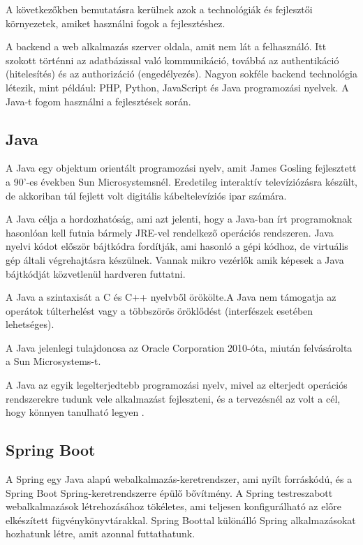 
A következőkben bemutatásra kerülnek azok a technológiák és fejlesztői környezetek, amiket használni fogok a fejlesztéshez.


A backend a web alkalmazás szerver oldala, amit nem lát a felhasználó. Itt szokott történni az adatbázissal való kommunikáció, továbbá az authentikáció (hitelesítés) és az authorizáció (engedélyezés). Nagyon sokféle backend technológia létezik, mint például: PHP, Python, JavaScript és Java programozási nyelvek. A Java-t fogom használni a fejlesztések során.

\subsection{Java}

A Java \cite{Java} egy objektum orientált programozási nyelv, amit James Gosling fejlesztett a 90’-es években Sun Microsystemsnél. Eredetileg interaktív televíziózásra készült, de akkoriban túl fejlett volt digitális kábeltelevíziós ipar számára.

A Java célja a hordozhatóság, ami azt jelenti, hogy a Java-ban írt programoknak hasonlóan kell futnia bármely JRE-vel rendelkező operációs rendszeren. Java nyelvi kódot először bájtkódra fordítják, ami hasonló a gépi kódhoz, de virtuális gép általi végrehajtásra készülnek. Vannak mikro vezérlők amik képesek a Java bájtkódját közvetlenül hardveren futtatni.

A Java a szintaxisát a C és C++ nyelvből örökölte.A Java nem támogatja az operátok túlterhelést vagy a többszörös öröklődést (interfészek esetében lehetséges).

A Java jelenlegi tulajdonosa az Oracle Corporation 2010-óta, miután felvásárolta a Sun Microsystems-t.

A Java az egyik legelterjedtebb programozási nyelv, mivel az elterjedt operációs rendszerekre tudunk vele alkalmazást fejleszteni, és a tervezésnél az volt a cél, hogy könnyen tanulható legyen .

\subsection{Spring Boot}

A Spring egy Java alapú webalkalmazás-keretrendszer, ami nyílt forráskódú, és a Spring Boot Spring-keretrendszerre épülő bővítmény. A Spring testreszabott webalkalmazások létrehozásához tökéletes, ami teljesen konfigurálható az előre elkészített fügvénykönyvtárakkal. Spring Boottal különálló Spring alkalmazásokat hozhatunk létre, amit azonnal futtathatunk.

